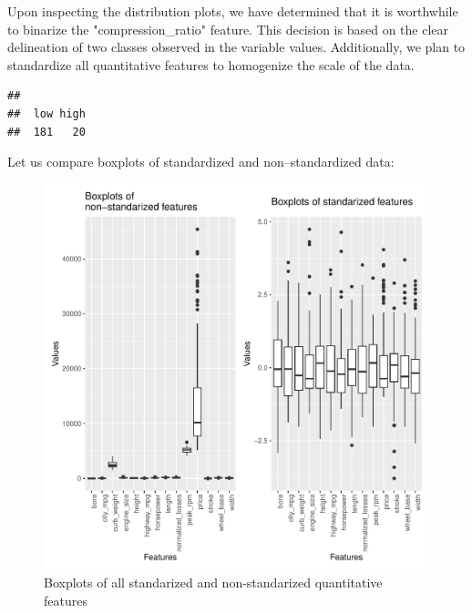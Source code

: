 \documentclass[11pt,a4paper]{article}\usepackage[]{graphicx}\usepackage[]{xcolor}
\makeatletter
\def\maxwidth{ %
  \ifdim\Gin@nat@width>\linewidth
    \linewidth
  \else
    \Gin@nat@width
  \fi
}
\newenvironment{kframe}{%
 \def\at@end@of@kframe{}%
 \ifinner\ifhmode%
  \def\at@end@of@kframe{\end{minipage}}%
  \begin{minipage}{\columnwidth}%
 \fi\fi%
 \def\FrameCommand##1{\hskip\@totalleftmargin \hskip-\fboxsep
 \colorbox{shadecolor}{##1}\hskip-\fboxsep
     \hskip-\linewidth \hskip-\@totalleftmargin \hskip\columnwidth}%
 \MakeFramed {\advance\hsize-\width
   \@totalleftmargin\z@ \linewidth\hsize
   \@setminipage}}%
 {\par\unskip\endMakeFramed%
 \at@end@of@kframe}
\newenvironment{knitrout}{}{} %
\makeatother
\begin{document}
Upon inspecting the distribution plots, we have determined that it is worthwhile to binarize the "compression\_ratio" feature. This decision is based on the clear delineation of two classes observed in the variable values. Additionally, we plan to standardize all quantitative features to homogenize the scale of the data.
	


	

\begin{knitrout}
\color{fgcolor}\begin{kframe}
\begin{verbatim}
## 
##  low high 
##  181   20
\end{verbatim}
\end{kframe}
\end{knitrout}
	

	
	
	Let us compare boxplots of standardized and non--standardized data:
	
\begin{knitrout}
\color{fgcolor}\begin{figure}
\includegraphics[width=\maxwidth]{figure/Boxplots_of_standarized_and_non_standarized_quantitative_features-1} \caption[Boxplots of all standarized and non-standarized quantitative features]{Boxplots of all standarized and non-standarized quantitative features}\label{fig:Boxplots_of_standarized_and_non_standarized_quantitative_features}
\end{figure}

\end{knitrout}
	
\end{document}
